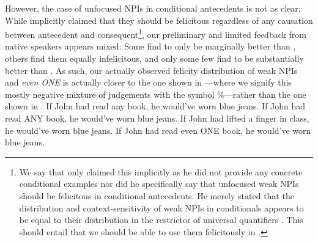 However, the case of unfocused NPIs in conditional antecedents is not as clear: While \textcite{Crnic2014-dogma} implicitly claimed that they should be felicitous regardless of any causation between antecedent and consequent\footnote{We say that \textcite{Crnic2014-dogma} only claimed this implicitly as he did not provide any concrete conditional examples nor did he specifically say that unfocused weak NPIs should be felicitous in conditional antecedents. He merely stated that the distribution and context-sensitivity of weak NPIs in conditionals appears to be equal to their distribution in the restrictor of universal quantifiers \parencite[p.~122--124]{Crnic2014-dogma}. This should entail that we should be able to use them felicitously in .}, our preliminary and limited feedback from native speakers appears mixed: Some find  to only be marginally better than , others find them equally infelicitous, and only some few find  to be substantially better than . As such, our actually observed felicity distribution of weak NPIs and \textit{even \MakeUppercase{one}} is actually closer to the one shown in ---where we signify this mostly negative mixture of judgements with the symbol \%---rather than the one shown in .
\pex[nopreamble=true]\label{ex:npi-conditional-bad-actual}%
\a{}\ljudge{\%} If John had read any book, he would've worn blue jeans.
\a{}\ljudge{\#} If John had read \MakeUppercase{any} book, he would've worn blue jeans.
\a{}\ljudge{\#} If John had lifted a finger in class, he would've worn blue jeans.
\a{}\ljudge{\#} If John had read even \MakeUppercase{one} book, he would've worn blue jeans.
\xe

